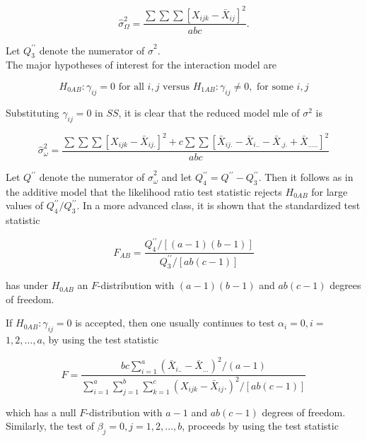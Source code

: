 \begin{equation*}
\hat{\sigma}_{\Omega}^{2}=\frac{\sum \sum \sum\left[X_{i j k}-\bar{X}_{i j}\right]^{2}}{a b c} . \tag{9.5.17}
\end{equation*}


Let $Q_{3}^{\prime \prime}$ denote the numerator of $\hat{\sigma}^{2}$.\\
The major hypotheses of interest for the interaction model are


\begin{equation*}
H_{0 A B}: \gamma_{i j}=0 \text { for all } i, j \text { versus } H_{1 A B}: \gamma_{i j} \neq 0, \text { for some } i, j \tag{9.5.18}
\end{equation*}


Substituting $\gamma_{i j}=0$ in $S S$, it is clear that the reduced model mle of $\sigma^{2}$ is


\begin{equation*}
\hat{\sigma}_{\omega}^{2}=\frac{\sum \sum \sum\left[X_{i j k}-\bar{X}_{i j .}\right]^{2}+c \sum \sum\left[\bar{X}_{i j .}-\bar{X}_{i . .}-\bar{X}_{. j .}+\bar{X}_{\ldots . .}\right]^{2}}{a b c} \tag{9.5.19}
\end{equation*}


Let $Q^{\prime \prime}$ denote the numerator of $\hat{\sigma}_{\omega}^{2}$ and let $Q_{4}^{\prime \prime}=Q^{\prime \prime}-Q_{3}^{\prime \prime}$. Then it follows as in the additive model that the likelihood ratio test statistic rejects $H_{0 A B}$ for large values of $Q_{4}^{\prime \prime} / Q_{3}^{\prime \prime}$. In a more advanced class, it is shown that the standardized test statistic


\begin{equation*}
F_{A B}=\frac{Q_{4}^{\prime \prime} /[(a-1)(b-1)]}{Q_{3}^{\prime \prime} /[a b(c-1)]} \tag{9.5.20}
\end{equation*}


has under $H_{0 A B}$ an $F$-distribution with $(a-1)(b-1)$ and $a b(c-1)$ degrees of freedom.

If $H_{0 A B}: \gamma_{i j}=0$ is accepted, then one usually continues to test $\alpha_{i}=0, i=$ $1,2, \ldots, a$, by using the test statistic

$$
F=\frac{b c \sum_{i=1}^{a}\left(\bar{X}_{i . .}-\bar{X}_{\ldots}\right)^{2} /(a-1)}{\sum_{i=1}^{a} \sum_{j=1}^{b} \sum_{k=1}^{c}\left(X_{i j k}-\bar{X}_{i j} .\right)^{2} /[a b(c-1)]}
$$

which has a null $F$-distribution with $a-1$ and $a b(c-1)$ degrees of freedom. Similarly, the test of $\beta_{j}=0, j=1,2, \ldots, b$, proceeds by using the test statistic

